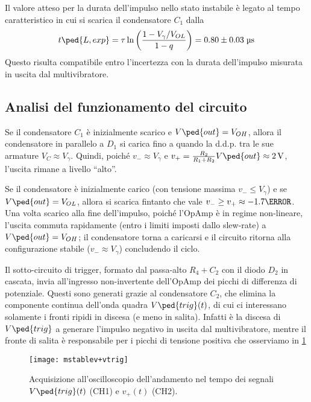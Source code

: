 \documentclass[10pt, a4paper, italian]{article}
\begin{document}
Il valore atteso per la durata dell'impulso nello stato instabile è legato
al tempo caratteristico in cui si scarica il condensatore $C_1$ dalla
\begin{equation}\label{eq: mstable_Delta}
t\ped{L, exp} = \tau \ln{\left(\frac{1 - V_\gamma/V_{OL}}{1 - q}\right)} =
0.80 \pm 0.03 \; \si{\micro\s}
\end{equation}
Questo risulta compatibile entro l'incertezza con la durata dell'impulso
misurata in uscita dal multivibratore.

\subsection{Analisi del funzionamento del circuito}
Se il condensatore $C_1$ è inizialmente scarico e $V\ped{out} = V_{OH}$, allora
il condensatore in parallelo a $D_1$ si carica fino a quando la d.d.p. tra le
sue armature $V_C \approx V_{\gamma}$. Quindi, poiché $v_- \approx V_{\gamma}$
e $v_+ = \frac{R_{2}}{R_{1} + R_{2}} V\ped{out} \approx \SI{2}{V}$, l'uscita
rimane a livello ``alto''.

Se il condensatore è inizialmente carico (con tensione massima
$v_- \leq V_\gamma$) e se $V\ped{out} = V_{OL}$, allora si scarica fintanto
che vale $v_- \geq v_+ \approx - 1.7 {\V}$. Una volta scarico alla fine
dell'impulso, poiché l'OpAmp è in regime non-lineare, l'uscita commuta
rapidamente (entro i limiti imposti dallo slew-rate) a $V\ped{out} = V_{OH}$;
il condensatore torna a caricarsi e il circuito ritorna alla configurazione
stabile ($v_- \approx V_\gamma$) concludendo il ciclo.

Il sotto-circuito di trigger, formato dal passa-alto $R_4 + C_2$ con il diodo
$D_2$ in cascata, invia all'ingresso non-invertente dell'OpAmp dei picchi di
differenza di potenziale. Questi sono generati grazie al condensatore $C_2$, 
che elimina la componente continua dell'onda quadra $V\ped{trig} (t)$, di cui
ci interessano solamente i fronti ripidi in discesa (e meno in salita).
Infatti è la discesa di $V\ped{trig}$ a generare l'impulso negativo in uscita
dal multivibratore, mentre il fronte di salita è responsabile per i picchi di
tensione positiva che osserviamo in \cref{fig: mstabilev+vtrig}
\begin{figure}[htbp]
	\centering
	\texttt{[image: mstablev+vtrig]}
	\caption{Acquisizione all'oscilloscopio dell'andamento nel tempo dei
	segnali $V\ped{trig} (t)$ (CH1) e $v_+ (t)$ (CH2).
	\label{fig: mstabilev+vtrig}}
\end{figure}
\end{document}
